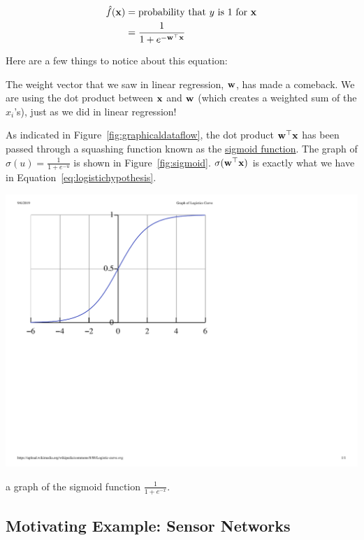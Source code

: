 \documentclass[assignment03_Solutions]{subfiles}
\begin{document}
\begin{align}
\hat{f}(\mathbf{x}) &= \mbox{probability that $y$ is 1 for $\mathbf{x}$} \nonumber \\
&=\frac{1}{1 + e^{-\mathbf{w}^\top \mathbf{x}}} \label{eq:logistichypothesis}
\end{align}

Here are a few things to notice about this equation:
\be
\item The weight vector that we saw in linear regression, $\mathbf{w}$, has made a comeback. We are using the dot product between $\mathbf{x}$ and $\mathbf{w}$ (which creates a weighted sum of the $x_i$'s), just as we did in linear regression!
\item As indicated in Figure~\ref{fig:graphicaldataflow}, the dot product $\mathbf{w}^\top \mathbf{x}$ has been passed through a squashing function known as the \href{https://en.wikipedia.org/wiki/Sigmoid_function}{sigmoid function}.  The graph of $\sigma(u) = \frac{1}{1+e^{-u}}$ is shown in Figure~\ref{fig:sigmoid}.  $\sigma( \mathbf{w}^\top \mathbf{x})$ is exactly what we have in Equation~\ref{eq:logistichypothesis}. 

\begin{marginfigure}
\includegraphics[width=\linewidth]{figures/Logistic-curve}
\caption{a graph of the sigmoid function $\frac{1}{1+e^{-x}}$.}\label{fig:sigmoid}
\end{marginfigure}
\ee

\subsection{Motivating Example: Sensor Networks}
\end{document}
